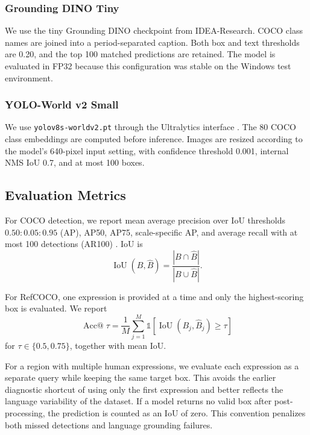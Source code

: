 \documentclass[conference]{IEEEtran}
\begin{document}
\subsubsection*{Grounding DINO Tiny}
We use the tiny Grounding DINO checkpoint from IDEA-Research. COCO class names
are joined into a period-separated caption. Both box and text thresholds are
0.20, and the top 100 matched predictions are retained. The model is evaluated
in FP32 because this configuration was stable on the Windows test environment.

\subsubsection*{YOLO-World v2 Small}
We use \texttt{yolov8s-worldv2.pt} through the Ultralytics interface
\cite{jocher2023ultralytics}. The 80 COCO class embeddings are computed before
inference. Images are resized according to the model's 640-pixel input setting,
with confidence threshold 0.001, internal NMS IoU 0.7, and at most 100 boxes.

\subsection{Evaluation Metrics}

For COCO detection, we report mean average precision over IoU thresholds
$0.50{:}0.05{:}0.95$ (AP), AP50, AP75, scale-specific AP, and average recall
with at most 100 detections (AR100) \cite{lin2014coco}. IoU is
\begin{equation}
  \operatorname{IoU}(B,\hat B)=
  \frac{|B\cap\hat B|}{|B\cup\hat B|}.
\end{equation}

For RefCOCO, one expression is provided at a time and only the
highest-scoring box is evaluated. We report
\begin{equation}
  \operatorname{Acc@}\tau =
  \frac{1}{M}\sum_{j=1}^{M}
  \mathbb{1}\left[\operatorname{IoU}(B_j,\hat B_j)\geq\tau\right]
\end{equation}
for $\tau\in\{0.5,0.75\}$, together with mean IoU.

For a region with multiple human expressions, we evaluate each expression as a
separate query while keeping the same target box. This avoids the earlier
diagnostic shortcut of using only the first expression and better reflects the
language variability of the dataset. If a model returns no valid box after
post-processing, the prediction is counted as an IoU of zero. This convention
penalizes both missed detections and language grounding failures.
\end{document}
